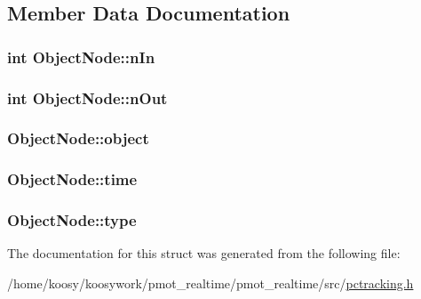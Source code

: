 \subsection{\-Member \-Data \-Documentation}
\hypertarget{struct_object_node_a10f5902c1668612e39b46150894bd0f9}{
\subsubsection[{n\-In}]{\setlength{\rightskip}{0pt plus 5cm}int {\bf \-Object\-Node\-::n\-In}}}\label{struct_object_node_a10f5902c1668612e39b46150894bd0f9}
\hypertarget{struct_object_node_a07820c0eda571bedfac7a04171c4786e}{
\subsubsection[{n\-Out}]{\setlength{\rightskip}{0pt plus 5cm}int {\bf \-Object\-Node\-::n\-Out}}}\label{struct_object_node_a07820c0eda571bedfac7a04171c4786e}
\hypertarget{struct_object_node_a9e1e36a7fe384526cb99ceddfd86e598}{
\subsubsection[{object}]{ {\bf \-Object\-Node\-::object}}}\label{struct_object_node_a9e1e36a7fe384526cb99ceddfd86e598}
\hypertarget{struct_object_node_a436ab00d9951d27c758081bad6c9d690}{
\subsubsection[{time}]{ {\bf \-Object\-Node\-::time}}}\label{struct_object_node_a436ab00d9951d27c758081bad6c9d690}
\hypertarget{struct_object_node_a5afed3ebe97aa3a945f29934532b5154}{
\subsubsection[{type}]{ {\bf \-Object\-Node\-::type}}}\label{struct_object_node_a5afed3ebe97aa3a945f29934532b5154}


\-The documentation for this struct was generated from the following file\-:\begin{DoxyCompactItemize}
\item 
/home/koosy/koosywork/pmot\-\_\-realtime/pmot\-\_\-realtime/src/\hyperlink{pctracking_8h}{pctracking.\-h}\end{DoxyCompactItemize}
